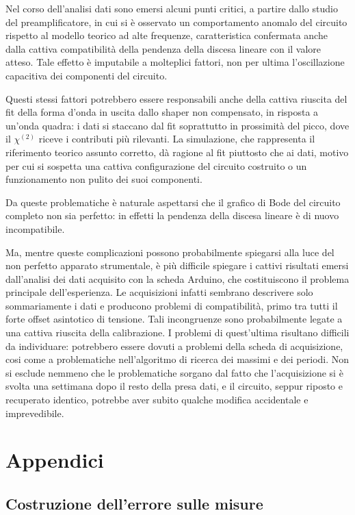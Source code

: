 \documentclass{article}
\begin{document}
Nel corso dell'analisi dati sono emersi alcuni punti critici, a partire dallo studio del preamplificatore, in cui si è osservato un comportamento anomalo del circuito
rispetto al modello teorico ad alte frequenze, caratteristica confermata anche dalla cattiva compatibilità della pendenza della discesa lineare con il valore atteso.
Tale effetto è imputabile a molteplici fattori, non per ultima l'oscillazione capacitiva dei componenti del circuito.

Questi stessi fattori potrebbero essere responsabili anche della cattiva riuscita del fit della forma d'onda in uscita dallo shaper non compensato, in risposta a
un'onda quadra: i dati si staccano dal fit soprattutto in prossimità del picco, dove il $\chi^{(2)}$ riceve i contributi più rilevanti. La simulazione, che rappresenta
il riferimento teorico assunto corretto, dà ragione al fit piuttosto che ai dati, motivo per cui si sospetta una cattiva configurazione del circuito costruito o un
funzionamento non pulito dei suoi componenti.

Da queste problematiche è naturale aspettarsi che il grafico di Bode del circuito completo non sia perfetto: in effetti la pendenza della discesa lineare è di nuovo
incompatibile.

Ma, mentre queste complicazioni possono probabilmente spiegarsi alla luce del non perfetto apparato strumentale, è più difficile spiegare i cattivi risultati emersi 
dall'analisi dei dati acquisito con la scheda Arduino, che costituiscono il problema principale dell'esperienza. 
Le acquisizioni infatti sembrano descrivere solo sommariamente i dati e producono problemi di compatibilità, primo tra tutti il forte offset asintotico di tensione. 
Tali incongruenze sono probabilmente legate a una cattiva riuscita della calibrazione. I problemi di quest'ultima risultano 
difficili da individuare: potrebbero essere dovuti a problemi della scheda di acquisizione, cosi come a problematiche nell'algoritmo di ricerca dei massimi e dei periodi.
Non si esclude nemmeno che le problematiche sorgano dal fatto che l'acquisizione si è 
svolta una settimana dopo il resto della presa dati, e il circuito, seppur riposto e recuperato identico, potrebbe aver subito qualche modifica accidentale e 
imprevedibile.



\newpage
\appendix
\section{Appendici}
\label{appendice}
\subsection{Costruzione dell'errore sulle misure}
\label{Calcerr}
\end{document}
